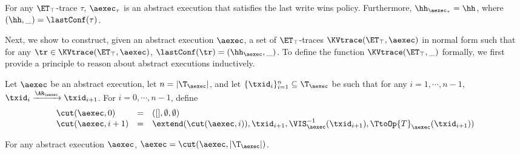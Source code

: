 \begin{proposition}
\label{prop:kvtrace2aexec}
For any $\ET_{\top}$-trace $\tau$, $\aexec_{\tau}$ is an abstract execution that 
satisfies the last write wins policy. Furthermore, $\hh_{\aexec_{\tau}} = \hh$, where 
$(\hh, \_) = \lastConf(\tau)$.
\end{proposition}

Next, we show to construct, given an abstract execution $\aexec$, 
a set of $\ET_{\top}$-traces $\KVtrace(\ET_{\top}, \aexec)$ in normal form such that for any 
$\tr \in \KVtrace(\ET_{\top}, \aexec)$, $\lastConf(\tr) = (\hh_{\aexec}, \_)$. 
To define the function $\KVtrace(\ET_{\top}, \_)$ formally, we first provide a principle 
to reason about abstract executions inductively. 
\begin{definition}
\label{def:aexec.inductive}
Let $\aexec$ be an abstract execution, let $n = \lvert \T_{\aexec} \rvert$, and let 
$\{\txid_{i}\}_{i=1}^{n} \subseteq \T_{\aexec}$ be such that for any $i=1,\cdots,n-1$, 
$\txid_{i} \xrightarrow{\AR_{\aexec}} \txid_{i+1}$. 
For $i = 0,\cdots, n-1$, define 
\[
\begin{array}{lll}
\cut(\aexec, 0) &=& ([], \emptyset, \emptyset)\\
\cut(\aexec , i+1) &=& \extend(\cut(\aexec, i)), \txid_{i+1}, \VIS^{-1}_{\aexec}(\txid_{i+1}), \TtoOp{T}_{\aexec}(\txid_{i+1}))
\end{array}
\]
\end{definition}

\begin{proposition}
\label{prop:aexec.inductive}
For any abstract execution $\aexec$, $\aexec = \cut(\aexec, \lvert \T_{\aexec} \rvert)$.
\end{proposition}

